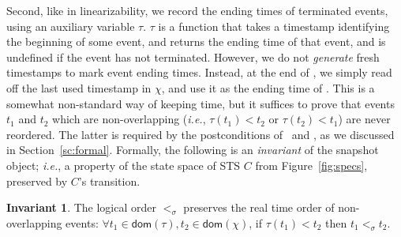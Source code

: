 \documentclass[a4paper,UKenglish]{lipics-v2016}
\newcommand{\ie}{\emph{i.e.}\xspace}
\newcommand{\dom}[1]{\mathsf{dom}(#1)}
\newcommand{\cf}{\textit{cf.}\xspace}
\newcommand{\hist}{\chi}
\def\ordlist{\sigma}
\newcommand{\E}{\tau}
\newcommand{\tle}{\mathrel{<_\ordlist}}
\theoremstyle{definition}
\newtheorem{invariant}[theorem]{Invariant}
\begin{document}
Second, like in linearizability, we record the ending times of
terminated events, using an auxiliary variable $\E$. $\E$ is a
function that takes a timestamp identifying the beginning of some
event, and returns the ending time of that event, and is undefined if
the event has not terminated. However, we do not \emph{generate} fresh
timestamps to mark event ending times. Instead, at the end of
\jywrite, we simply read off the last used timestamp in $\hist$, and
use it as the ending time of \jywrite. This is a somewhat non-standard
way of keeping time, but it suffices to prove that events $t_1$ and
$t_2$ which are non-overlapping (\ie, $\E(t_1) < t_2$ or $\E(t_2) <
t_1$) are never reordered. The latter is required by the
postconditions of \jywrite\ and \jyscan, as we discussed in
Section~\ref{sc:formal}. 
%
%
%
Formally, the following is an \emph{invariant} of the snapshot object;
\ie, a property of the state space of STS $C$ from
Figure~\ref{fig:specs}, preserved by $C$'s transition.

\begin{invariant}\label{inv:overlap}%
The logical order $\tle$ preserves the real time order of
non-over\-lap\-ping events: $\forall t_1 \in \dom{\E}, t_2 \in
\dom{\hist}$, if $\E(t_1) < t_2$ then $t_1 \tle t_2$.
\end{invariant}
\end{document}
